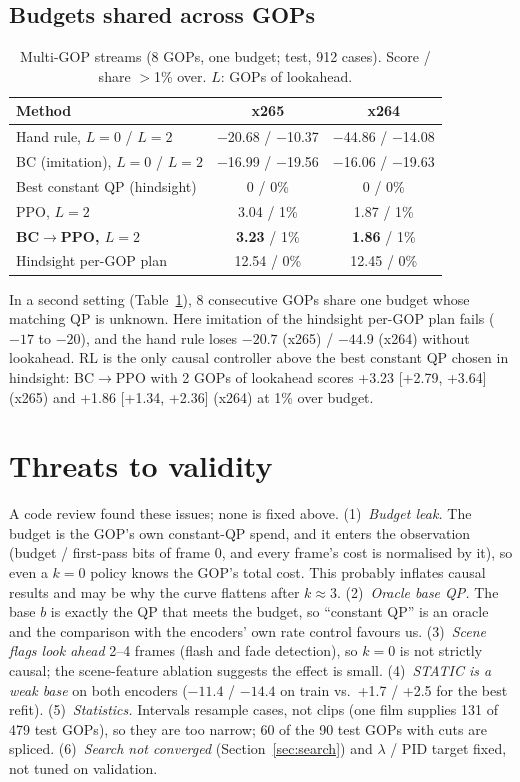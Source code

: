 \documentclass[conference,10pt]{IEEEtran}
\newcommand{\bcppo}{BC$\to$PPO}
\begin{document}
\subsection{Budgets shared across GOPs}
\begin{table}[t]
\centering\scriptsize
\caption{Multi-GOP streams (8 GOPs, one budget; test, 912 cases). Score / share $>$1\% over. $L$: GOPs of lookahead.}
\label{tab:multigop}
\setlength{\tabcolsep}{4pt}
\begin{tabular}{@{}lcc@{}}
\toprule
Method & x265 & x264\\
\midrule
Hand rule, $L{=}0$ / $L{=}2$ & $-$20.68 / $-$10.37 & $-$44.86 / $-$14.08\\
BC (imitation), $L{=}0$ / $L{=}2$ & $-$16.99 / $-$19.56 & $-$16.06 / $-$19.63\\
Best constant QP (hindsight) & 0 / 0\% & 0 / 0\%\\
PPO, $L{=}2$ & 3.04 / 1\% & 1.87 / 1\%\\
\textbf{\bcppo, $L{=}2$} & \textbf{3.23} / 1\% & \textbf{1.86} / 1\%\\
Hindsight per-GOP plan & 12.54 / 0\% & 12.45 / 0\%\\
\bottomrule
\end{tabular}
\end{table}
In a second setting (Table~\ref{tab:multigop}), 8 consecutive GOPs share one budget whose matching QP is unknown. Here imitation of the hindsight per-GOP plan fails ($-17$ to $-20$), and the hand rule loses $-20.7$ (x265) / $-44.9$ (x264) without lookahead. RL is the only causal controller above the best constant QP chosen in hindsight: \bcppo{} with 2 GOPs of lookahead scores +3.23 [+2.79, +3.64] (x265) and +1.86 [+1.34, +2.36] (x264) at 1\% over budget.

\section{Threats to validity}\label{sec:threats}
A code review found these issues; none is fixed above.
(1)~\emph{Budget leak.} The budget is the GOP's own constant-QP spend, and it enters the observation (budget / first-pass bits of frame 0, and every frame's cost is normalised by it), so even a $k{=}0$ policy knows the GOP's total cost. This probably inflates causal results and may be why the curve flattens after $k{\approx}3$.
(2)~\emph{Oracle base QP.} The base $b$ is exactly the QP that meets the budget, so ``constant QP'' is an oracle and the comparison with the encoders' own rate control favours us.
(3)~\emph{Scene flags look ahead} 2--4 frames (flash and fade detection), so $k{=}0$ is not strictly causal; the scene-feature ablation suggests the effect is small.
(4)~\emph{STATIC is a weak base} on both encoders ($-11.4$ / $-14.4$ on train vs.\ +1.7 / +2.5 for the best refit).
(5)~\emph{Statistics.} Intervals resample cases, not clips (one film supplies 131 of 479 test GOPs), so they are too narrow; 60 of the 90 test GOPs with cuts are spliced.
(6)~\emph{Search not converged} (Section~\ref{sec:search}) and $\lambda$ / PID target fixed, not tuned on validation.
\end{document}
